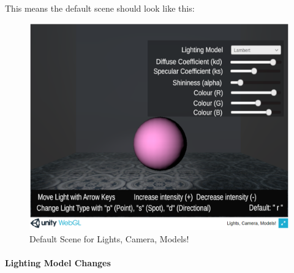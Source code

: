 \documentclass[12pt, titlepage]{article}
\newcommand{\famname}{Lights, Camera, Models!}
\begin{document}
This means the default scene should look like this:

\begin{figure}[h]
	\centering
	\includegraphics[scale=0.25]{./images/sphere-lit-lambert}
	\caption{Default Scene for \famname}
\end{figure}


\paragraph{Lighting Model Changes}
\end{document}
